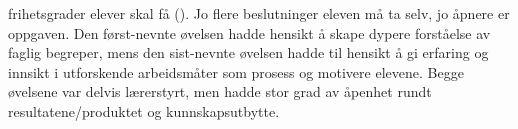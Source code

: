 \documentclass[main.tex]{subfiles}
\begin{document}
frihetsgrader elever skal få (). Jo flere beslutninger eleven må ta selv, jo åpnere 
er oppgaven. Den først-nevnte øvelsen hadde hensikt å skape dypere forståelse av faglig begreper, 
mens den sist-nevnte øvelsen hadde til hensikt å gi erfaring og innsikt i utforskende arbeidsmåter 
som prosess og motivere elevene. Begge øvelsene var delvis lærerstyrt, men hadde stor grad av 
åpenhet rundt resultatene/produktet og kunnskapsutbytte.
\end{document}
